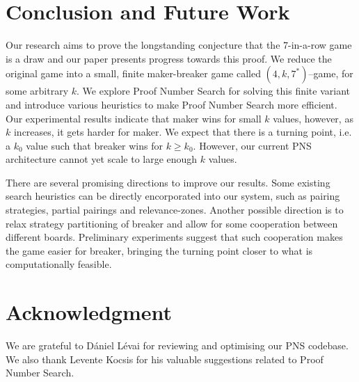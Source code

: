 \documentclass[conference]{IEEEtran}
\theoremstyle{definition}
\begin{document}
\section{Conclusion and Future Work}
Our research aims to prove the longstanding conjecture that the 7-in-a-row game is a draw and our paper presents progress towards this proof. We reduce the original game into a small, finite maker-breaker game called $(4,k,7^*)$--game, for some arbitrary $k$. We explore Proof Number Search for solving this finite variant and introduce various heuristics to make Proof Number Search more efficient. Our experimental results indicate that maker wins for small $k$ values, however, as $k$ increases, it gets harder for maker. We expect that there is a turning point, i.e. a $k_0$ value such that breaker wins for $k \geq k_0$. However, our current PNS architecture cannot yet scale to large enough $k$ values.

There are several promising directions to improve our results. Some existing search heuristics can be directly encorporated into our system, such as pairing strategies, partial pairings and relevance-zones. 
Another possible direction is to relax strategy partitioning of breaker and allow for some cooperation between different boards. Preliminary experiments suggest that such cooperation makes the game easier for breaker, bringing the turning point closer to what is computationally feasible.

\section*{Acknowledgment}
We are grateful to D\'{a}niel L\'{e}vai for reviewing and optimising our PNS codebase. We also thank Levente Kocsis for his valuable suggestions related to Proof Number Search.



\end{document}

